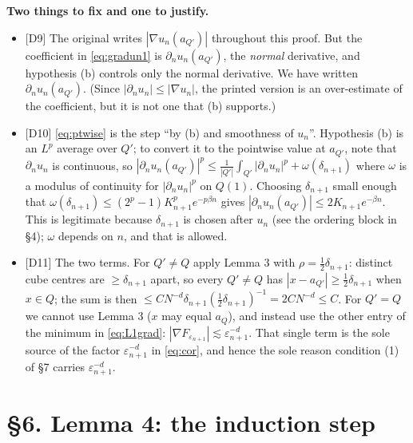 \documentclass[11pt,reqno]{amsart}
\theoremstyle{plain}
\theoremstyle{definition}
\theoremstyle{plain}
\theoremstyle{definition}
\theoremstyle{remark}
\newcommand{\nd}{\partial_n}
\newcommand{\Ledger}[1]{{\scriptsize\textsf{[#1]}}}
\begin{document}
\begin{expansion}
\textbf{Two things to fix and one to justify.}
\begin{itemize}[leftmargin=1.4em,itemsep=3pt]
\item \Ledger{D9} The original writes $|\nabla u_n(a_{Q'})|$ throughout this proof.
  But the coefficient in \eqref{eq:gradun1} is $\nd u_n(a_{Q'})$, the \emph{normal}
  derivative, and hypothesis (b) controls only the normal derivative. We have
  written $\nd u_n(a_{Q'})$. (Since $|\nd u_n|\le|\nabla u_n|$, the printed version
  is an over-estimate of the coefficient, but it is not one that (b) supports.)
\item \Ledger{D10} \eqref{eq:ptwise} is the step ``by (b) and smoothness of $u_n$''.
  Hypothesis (b) is an $L^p$ average over $Q'$; to convert it to the pointwise value
  at $a_{Q'}$, note that $\nd u_n$ is continuous, so
  $|\nd u_n(a_{Q'})|^p\le\frac1{|Q'|}\int_{Q'}|\nd u_n|^p+\omega(\delta_{n+1})$
  where $\omega$ is a modulus of continuity for $|\nd u_n|^p$ on $Q(1)$. Choosing
  $\delta_{n+1}$ small enough that
  $\omega(\delta_{n+1})\le(2^p-1)K_{n+1}^pe^{-p\beta n}$ gives
  $|\nd u_n(a_{Q'})|\le2K_{n+1}e^{-\beta n}$. This is legitimate because
  $\delta_{n+1}$ is chosen after $u_n$ (see the ordering block in \S4); $\omega$
  depends on $n$, and that is allowed.
\item \Ledger{D11} The two terms. For $Q'\ne Q$ apply Lemma 3 with
  $\rho=\frac12\delta_{n+1}$: distinct cube centres are $\ge\delta_{n+1}$ apart, so
  every $Q'\ne Q$ has $|x-a_{Q'}|\ge\frac12\delta_{n+1}$ when $x\in Q$; the sum is
  then $\le CN^{-d}\delta_{n+1}(\frac12\delta_{n+1})^{-1}=2CN^{-d}\le C$. For
  $Q'=Q$ we cannot use Lemma 3 ($x$ may equal $a_Q$), and instead use the other
  entry of the minimum in \eqref{eq:L1grad}:
  $|\nabla F_{\varepsilon_{n+1}}|\lesssim\varepsilon_{n+1}^{-d}$. That single term
  is the sole source of the factor $\varepsilon_{n+1}^{-d}$ in \eqref{eq:cor}, and
  hence the sole reason condition (1) of \S7 carries $\varepsilon_{n+1}^{-d}$.
\end{itemize}
\end{expansion}

\section*{\S6. Lemma 4: the induction step}
\end{document}
